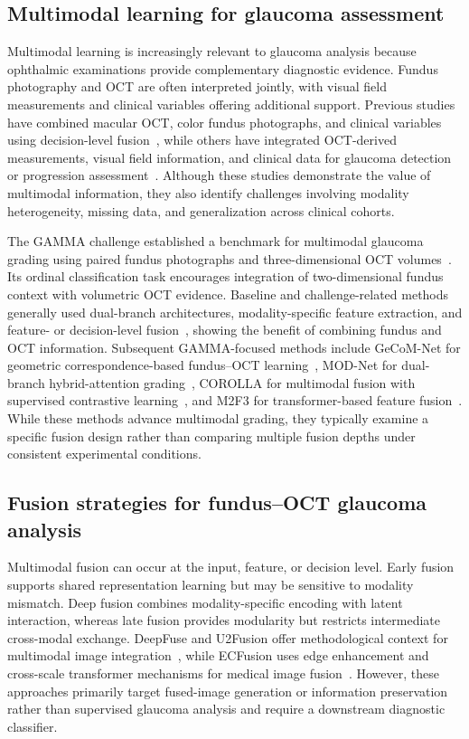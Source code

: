 \documentclass{ieeeaccess}
\begin{document}
\subsection{Multimodal learning for glaucoma assessment}
\label{subsec:multimodal_glaucoma_learning}

Multimodal learning is increasingly relevant to glaucoma analysis because ophthalmic examinations provide complementary diagnostic evidence. Fundus photography and OCT are often interpreted jointly, with visual field measurements and clinical variables offering additional support. Previous studies have combined macular OCT, color fundus photographs, and clinical variables using decision-level fusion~\cite{mehta2021automated}, while others have integrated OCT-derived measurements, visual field information, and clinical data for glaucoma detection or progression assessment~\cite{luo2023harvard,hwang2025utilization,lim2022use}. Although these studies demonstrate the value of multimodal information, they also identify challenges involving modality heterogeneity, missing data, and generalization across clinical cohorts.

The GAMMA challenge established a benchmark for multimodal glaucoma grading using paired fundus photographs and three-dimensional OCT volumes~\cite{wu2023gamma}. Its ordinal classification task encourages integration of two-dimensional fundus context with volumetric OCT evidence. Baseline and challenge-related methods generally used dual-branch architectures, modality-specific feature extraction, and feature- or decision-level fusion~\cite{wu2023gamma}, showing the benefit of combining fundus and OCT information. Subsequent GAMMA-focused methods include GeCoM-Net for geometric correspondence-based fundus--OCT learning~\cite{wang2024geometric}, MOD-Net for dual-branch hybrid-attention grading~\cite{wang2025dual}, COROLLA for multimodal fusion with supervised contrastive learning~\cite{cai2022corolla}, and M2F3 for transformer-based feature fusion~\cite{zhao2025enhancing}. While these methods advance multimodal grading, they typically examine a specific fusion design rather than comparing multiple fusion depths under consistent experimental conditions.

\subsection{Fusion strategies for fundus--OCT glaucoma analysis}
\label{subsec:fusion_strategies}

Multimodal fusion can occur at the input, feature, or decision level. Early fusion supports shared representation learning but may be sensitive to modality mismatch. Deep fusion combines modality-specific encoding with latent interaction, whereas late fusion provides modularity but restricts intermediate cross-modal exchange. DeepFuse and U2Fusion offer methodological context for multimodal image integration~\cite{ram2017deepfuse,xu2020u2fusion}, while ECFusion uses edge enhancement and cross-scale transformer mechanisms for medical image fusion~\cite{luo2025novel}. However, these approaches primarily target fused-image generation or information preservation rather than supervised glaucoma analysis and require a downstream diagnostic classifier.
\end{document}

